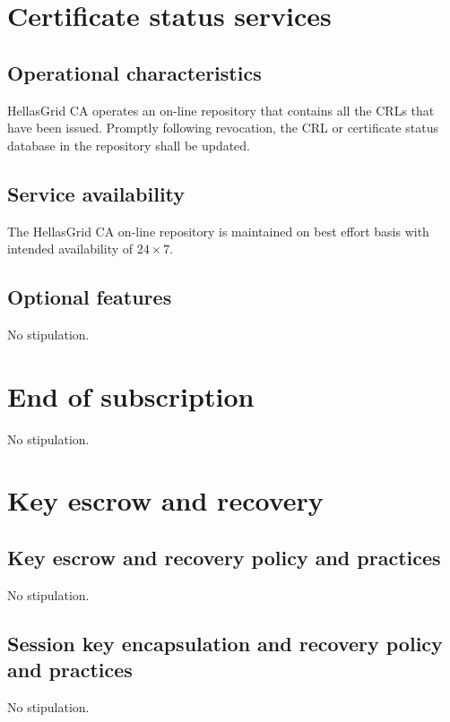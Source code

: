 \section{Certificate status services}
\subsection{Operational characteristics}
\label{sub:OperationalCharacteristics}

HellasGrid CA operates an on-line repository that contains all the CRLs that have been issued. Promptly following revocation, the CRL or certificate status database in the repository shall be updated.


\subsection{Service availability}

The HellasGrid CA on-line repository is maintained on best effort basis with intended availability of $24\times 7$.

\subsection{Optional features}

No stipulation. 

\section{End of subscription}

No stipulation.

\section{Key escrow and recovery}


\subsection{Key escrow and recovery policy and practices}

No stipulation.

\subsection{Session key encapsulation and recovery policy and practices}

No stipulation.

